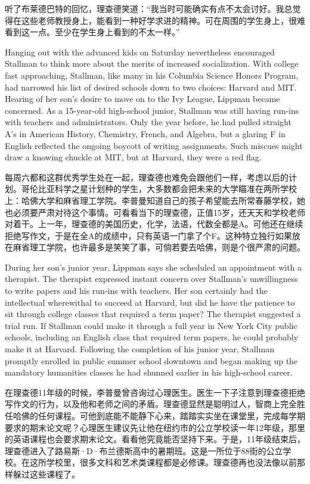 \ifdefined\chs
听了布莱德巴特的回忆，理查德笑道：“我当时可能确实有点不太会讨好。我总觉得在这些老师教授身上，能看到一种好学求进的精神。可在周围的学生身上，很难看到这一点。至少在学生身上看到的不太一样。”
\fi

\ifdefined\eng
Hanging out with the advanced kids on Saturday nevertheless encouraged Stallman to think more about the merits of increased socialization. With college fast approaching, Stallman, like many in his Columbia Science Honors Program, had narrowed his list of desired schools down to two choices: Harvard and MIT. Hearing of her son's desire to move on to the Ivy League, Lippman became concerned. As a 15-year-old high-school junior, Stallman was still having run-ins with teachers and administrators. Only the year before, he had pulled straight A's in American History, Chemistry, French, and Algebra, but a glaring F in English reflected the ongoing boycott of writing assignments. Such miscues might draw a knowing chuckle at MIT, but at Harvard, they were a red flag.
\fi

\ifdefined\chs
每周六都和这群优秀学生处在一起，理查德也难免会跟他们一样，考虑以后的计划。哥伦比亚科学之星计划种的学生，大多数都会把未来的大学瞄准在两所学校上：哈佛大学和麻省理工学院。李普曼知道自己的孩子希望能去所常春藤学校，她也必须要严肃对待这个事情。可看看当下的理查德，正值15岁，还天天和学校老师对着干。上一年，理查德的美国历史，化学，法语，代数全都是A。可他还在继续拒绝写作文，于是在全A的成绩中，只有英语一门拿了个F。这种特立独行如果放在麻省理工学院，也许最多是笑笑了事，可倘若要去哈佛，则是个很严肃的问题。
\fi

\ifdefined\eng
During her son's junior year, Lippman says she scheduled an appointment with a therapist. The therapist expressed instant concern over Stallman's unwillingness to write papers and his run-ins with teachers. Her son certainly had the intellectual wherewithal to succeed at Harvard, but did he have the patience to sit through college classes that required a term paper? The therapist suggested a trial run. If Stallman could make it through a full year in New York City public schools, including an English class that required term papers, he could probably make it at Harvard. Following the completion of his junior year, Stallman promptly enrolled in public summer school downtown and began making up the mandatory humanities classes he had shunned earlier in his high-school career.
\fi

\ifdefined\chs
在理查德11年级的时候，李普曼曾咨询过心理医生。医生一下子注意到理查德拒绝写作文的行为，以及他和老师之间的矛盾。理查德显然是聪明过人，智商上完全胜任哈佛的任何课程。可他到底能不能静下心来，踏踏实实坐在课堂里，完成每学期要求的期末论文呢？心理医生建议先让他在纽约市的公立学校读一年12年级，那里的英语课程也会要求期末论文。看看他究竟能否坚持下来。于是，11年级结束后，理查德进入了路易斯·D·布兰德斯高中的暑期班。这是一所位于88街的公立学校。在这所学校里，很多文科和艺术类课程都是必修课。理查德再也没法像以前那样躲过这些课程了。
\fi

